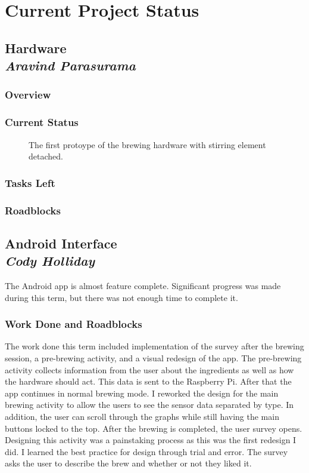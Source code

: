 \documentclass[draftclsnofoot,onecolumn,letterpaper,10pt]{IEEEtran}
\begin{document}
\section{Current Project Status}

\subsection{Hardware\\{\em\textbf{Aravind Parasurama}}}
\subsubsection{Overview}

\subsubsection{Current Status}
\begin{figure}
\label{fig:hw1}
\caption{The first protoype of the brewing hardware with stirring element detached.}
\end{figure}

\subsubsection{Tasks Left}

\subsubsection{Roadblocks}

\subsection{Android Interface\\{\em\textbf{Cody Holliday}}}
The Android app is almost feature complete. Significant progress was made during this term, but there was not enough time to complete it.


\subsubsection{Work Done and Roadblocks}
The work done this term included implementation of the survey after the brewing session, a pre-brewing activity, and a visual redesign of the app.
The pre-brewing activity collects information from the user about the ingredients as well as how the hardware should act.
This data is sent to the Raspberry Pi. After that the app continues in normal brewing mode.
I reworked the design for the main brewing activity to allow the users to see the sensor data separated by type.
In addition, the user can scroll through the graphs while still having the main buttons locked to the top.
After the brewing is completed, the user survey opens. 
Designing this activity was a painstaking process as this was the first redesign I did. I learned the best practice for design through trial and error.
The survey asks the user to describe the brew and whether or not they liked it.
\end{document}
